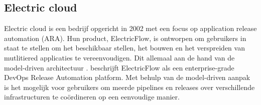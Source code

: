 %
\subsection{Electric cloud}
Electric cloud is een bedrijf opgericht in 2002 met een focus op application release automation (ARA).
Hun product, ElectricFlow, is ontworpen om gebruikers in staat te stellen om het beschikbaar stellen, het bouwen en het verspreiden van mutlitiered applicaties te vereenvoudigen.
Dit allemaal aan de hand van de model-driven architectuur \citep{gartner}.
\citet{electricflow} beschrijft ElectricFlow als een enterprise-grade DevOps Release Automation platform.
Met behulp van de model-driven aanpak is het mogelijk voor gebruikers om meerde pipelines en releases over verschillende infrastructuren te coördineren op een eenvoudige manier.

